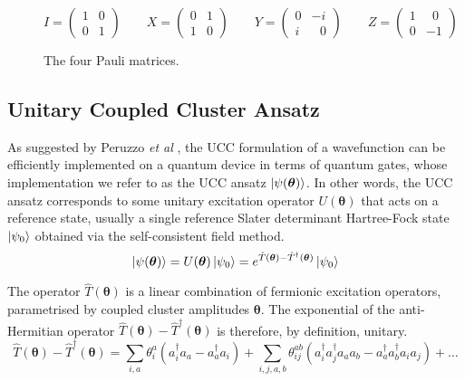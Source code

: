 \begin{figure}[H]
    \centering
    \begin{equation*}
        I = \begin{pmatrix} 1 & 0 \\ 0 & 1\end{pmatrix} \qquad
        X = \begin{pmatrix} 0 & 1 \\ 1 & 0\end{pmatrix} \qquad
        Y = \begin{pmatrix} 0 & -i \\ i & \,\,\,\,0\end{pmatrix} \qquad
        Z = \begin{pmatrix} 1 & \,\,\,0 \\ 0 & -1\end{pmatrix}
    \end{equation*}
    \caption{The four Pauli matrices.}
    \label{pauli-matrices}
\end{figure}



\subsection{Unitary Coupled Cluster Ansatz}%
\label{unitary-coupled-cluster-ansatz}

As suggested by Peruzzo \textit{et al} \cite{Peruzzo2014}, the UCC formulation of a wavefunction can be efficiently implemented on a quantum device in terms of quantum gates, whose implementation we refer to as the UCC ansatz $\ket{\psi(\bm\theta)}$. In other words, the UCC ansatz corresponds to some unitary excitation operator $U(\bm\theta)$ that acts on a reference state, usually a single reference Slater determinant Hartree-Fock state $\ket{\psi_0}$ obtained via the self-consistent field method.
\begin{equation*}
    \ket{\psi(\bm\theta)} = U(\bm\theta) \ket{\psi_0} =
    e^{\hat T(\bm\theta) - \hat T^\dagger(\bm\theta)} \ket{\psi_0}
\end{equation*}

The operator $\hat T(\bm\theta)$ is a linear combination of fermionic excitation operators, parametrised by coupled cluster amplitudes $\bm\theta$. The exponential of the anti-Hermitian operator $\hat T(\bm\theta) - \hat T^\dagger(\bm\theta)$ is therefore, by definition, unitary. 
\begin{equation*}
\hat T(\bm{\theta}) - \hat T^{\dagger}(\bm{\theta}) =
\sum_{i, a} \theta^a_i (a^\dagger_i a_a - a^\dagger_a a_i) + 
\sum_{i, j, a, b} \theta^{ab}_{ij} (a^\dagger_i a^\dagger_j a_a a_b - a^\dagger_a a^\dagger_b a_i a_j) + \dots
\end{equation*}

